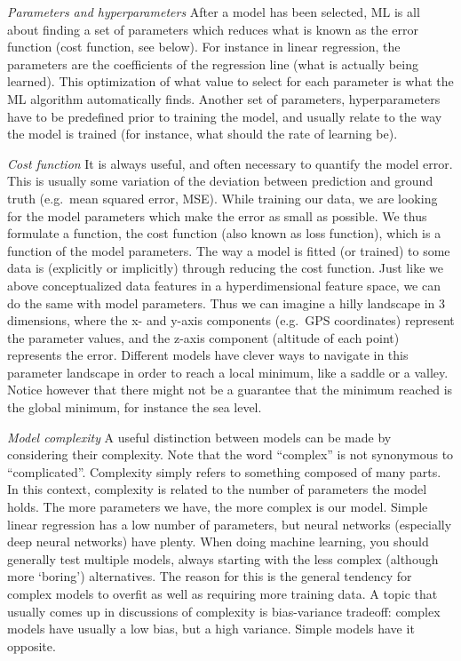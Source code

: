 \documentclass[
]{book}
\begin{document}
\emph{Parameters and hyperparameters}
After a model has been selected, ML is all about finding a set of parameters which reduces what is known as the error function (cost function, see below). For instance in linear regression, the parameters are the coefficients of the regression line (what is actually being learned). This optimization of what value to select for each parameter is what the ML algorithm automatically finds. Another set of parameters, hyperparameters have to be predefined prior to training the model, and usually relate to the way the model is trained (for instance, what should the rate of learning be).

\emph{Cost function}
It is always useful, and often necessary to quantify the model error. This is usually some variation of the deviation between prediction and ground truth (e.g.~mean squared error, MSE). While training our data, we are looking for the model parameters which make the error as small as possible. We thus formulate a function, the cost function (also known as loss function), which is a function of the model parameters. The way a model is fitted (or trained) to some data is (explicitly or implicitly) through reducing the cost function. Just like we above conceptualized data features in a hyperdimensional feature space, we can do the same with model parameters. Thus we can imagine a hilly landscape in 3 dimensions, where the x- and y-axis components (e.g.~GPS coordinates) represent the parameter values, and the z-axis component (altitude of each point) represents the error. Different models have clever ways to navigate in this parameter landscape in order to reach a local minimum, like a saddle or a valley. Notice however that there might not be a guarantee that the minimum reached is the global minimum, for instance the sea level.

\emph{Model complexity}
A useful distinction between models can be made by considering their complexity. Note that the word ``complex'' is not synonymous to ``complicated''. Complexity simply refers to something composed of many parts. In this context, complexity is related to the number of parameters the model holds. The more parameters we have, the more complex is our model. Simple linear regression has a low number of parameters, but neural networks (especially deep neural networks) have plenty. When doing machine learning, you should generally test multiple models, always starting with the less complex (although more `boring') alternatives. The reason for this is the general tendency for complex models to overfit as well as requiring more training data. A topic that usually comes up in discussions of complexity is bias-variance tradeoff: complex models have usually a low bias, but a high variance. Simple models have it opposite.
\end{document}
